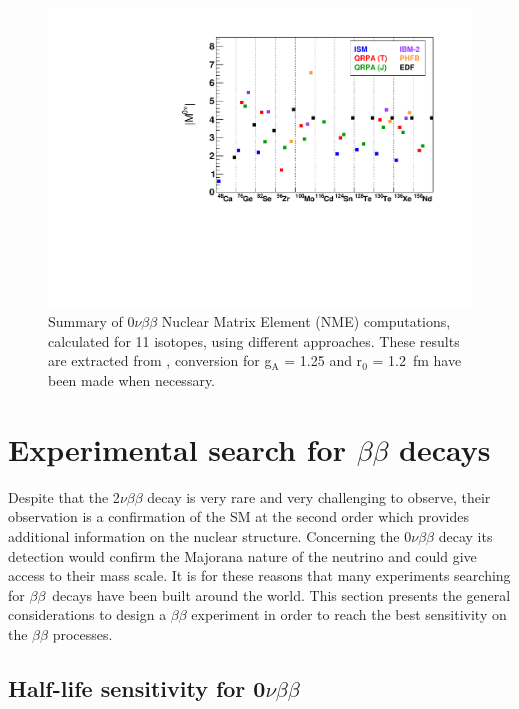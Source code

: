 \documentclass[main.tex]{subfiles}
\begin{document}
\begin{figure}[h!]
\begin{center}
\includegraphics[scale=0.6]{pictures/Chap2/NMEvalue.pdf}
\caption{Summary of 0$\nu\beta\beta$ Nuclear Matrix Element (NME) computations, calculated for 11 isotopes, using different approaches. These results are extracted from \cite{TheoryOfNeutrinolessDBD}, conversion for g$_{\text{A}}$ = 1.25 and r$_{\text{0}}$  = 1.2~fm have been made when necessary.}
\label{NME}
\end{center}
\end{figure}


\FloatBarrier


\section{Experimental search for $\beta\beta$ decays}\label{sec:ExperimentalSearch0nu}


\NI Despite that the 2$\nu\beta\beta$ decay is very rare and very challenging to observe, their observation is a confirmation of the SM at the second order which provides additional information on the nuclear structure. Concerning the 0$\nu\beta\beta$ decay its detection would confirm the Majorana nature of the neutrino and could give access to their mass scale. It is for these reasons that many experiments searching for $\beta\beta$~decays have been built around the world. This section presents the general considerations to design a $\beta\beta$ experiment in order to reach the best sensitivity on the $\beta\beta$ processes.


\subsection{Half-life sensitivity for 0$\nu\beta\beta$}
\end{document}
